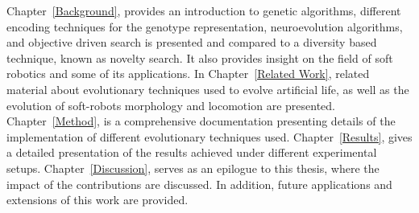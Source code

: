 Chapter~\ref{Background}, provides an introduction to genetic algorithms, different encoding techniques for the genotype representation, neuroevolution algorithms, and objective driven search is presented and compared to a diversity based technique, known as novelty search. It also provides insight on the field of soft robotics and some of its applications. In Chapter~\ref{Related Work}, related material about evolutionary techniques used to evolve artificial life, as well as the evolution of soft-robots morphology and locomotion are presented. Chapter~\ref{Method}, is a comprehensive documentation presenting details of the implementation of different evolutionary techniques used. Chapter~\ref{Results}, gives a detailed presentation of the results achieved under different experimental setups. Chapter~\ref{Discussion}, serves as an epilogue to this thesis, where the impact of the contributions are discussed. In addition, future applications and extensions of this work are provided.







